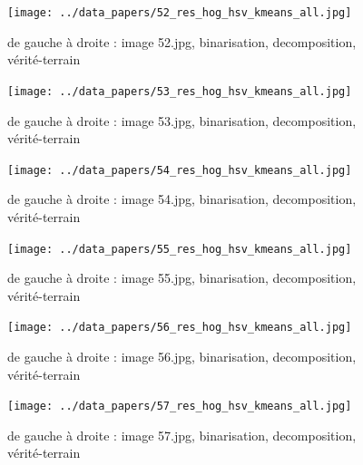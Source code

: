 \documentclass{book}
\begin{document}
\begin{figure}[H]
\begin{center}
\texttt{[image: ../data\_papers/52\_res\_hog\_hsv\_kmeans\_all.jpg]}
\end{center}
\caption{de gauche à droite : image 52.jpg, binarisation, decomposition, vérité-terrain}
\label{52}
\end{figure}
\clearpage


\begin{figure}[H]
\begin{center}
\texttt{[image: ../data\_papers/53\_res\_hog\_hsv\_kmeans\_all.jpg]}
\end{center}
\caption{de gauche à droite : image 53.jpg, binarisation, decomposition, vérité-terrain}
\label{53}
\end{figure}
\clearpage


\begin{figure}[H]
\begin{center}
\texttt{[image: ../data\_papers/54\_res\_hog\_hsv\_kmeans\_all.jpg]}
\end{center}
\caption{de gauche à droite : image 54.jpg, binarisation, decomposition, vérité-terrain}
\label{54}
\end{figure}
\clearpage


\begin{figure}[H]
\begin{center}
\texttt{[image: ../data\_papers/55\_res\_hog\_hsv\_kmeans\_all.jpg]}
\end{center}
\caption{de gauche à droite : image 55.jpg, binarisation, decomposition, vérité-terrain}
\label{55}
\end{figure}
\clearpage


\begin{figure}[H]
\begin{center}
\texttt{[image: ../data\_papers/56\_res\_hog\_hsv\_kmeans\_all.jpg]}
\end{center}
\caption{de gauche à droite : image 56.jpg, binarisation, decomposition, vérité-terrain}
\label{56}
\end{figure}
\clearpage


\begin{figure}[H]
\begin{center}
\texttt{[image: ../data\_papers/57\_res\_hog\_hsv\_kmeans\_all.jpg]}
\end{center}
\caption{de gauche à droite : image 57.jpg, binarisation, decomposition, vérité-terrain}
\label{57}
\end{figure}
\clearpage
\end{document}
